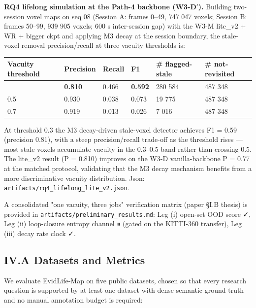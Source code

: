\documentclass[
]{article}
\newcounter{none} %
\begin{document}
\textbf{RQ4 lifelong simulation at the Path-4 backbone (W3-D′).}
Building two-session voxel maps on seq 08 (Session A: frames 0--49, 747
047 voxels; Session B: frames 50--99, 939 905 voxels; 600 s
inter-session gap) with the W3-M lite\_v2 + WR + bigger ckpt and
applying M3 decay at the session boundary, the stale-voxel removal
precision/recall at three vacuity thresholds is:

{\def\LTcaptype{none} %
\begin{longtable}[]{@{}llllll@{}}
\toprule\noalign{}
Vacuity threshold & Precision & Recall & F1 & \# flagged-stale & \#
not-revisited \\
\midrule\noalign{}
\endhead
\bottomrule\noalign{}
\endlastfoot
0.3 & \textbf{0.810} & 0.466 & \textbf{0.592} & 280 584 & 487 348 \\
0.5 & 0.930 & 0.038 & 0.073 & 19 775 & 487 348 \\
0.7 & 0.919 & 0.013 & 0.026 & 7 016 & 487 348 \\
\end{longtable}
}

At threshold 0.3 the M3 decay-driven stale-voxel detector achieves F1 =
0.59 (precision 0.81), with a steep precision/recall trade-off as the
threshold rises --- most stale voxels accumulate vacuity in the 0.3--0.5
band rather than crossing 0.5. The lite\_v2 result (P = 0.810) improves
on the W3-D vanilla-backbone P = 0.77 at the matched protocol,
validating that the M3 decay mechanism benefits from a more
discriminative vacuity distribution. Json:
\texttt{artifacts/rq4\_lifelong\_lite\_v2.json}.

A consolidated "one vacuity, three jobs" verification matrix (paper §I.B
thesis) is provided in \texttt{artifacts/preliminary\_results.md}: Leg
(i) open-set OOD score ✓, Leg (ii) loop-closure entropy channel ⏸ (gated
on the KITTI-360 transfer), Leg (iii) decay rate clock ✓.

\subsection{IV.A Datasets and Metrics}\label{iva-datasets-and-metrics}

We evaluate EvidLife-Map on five public datasets, chosen so that every
research question is supported by at least one dataset with dense
semantic ground truth and no manual annotation budget is required:
\end{document}
